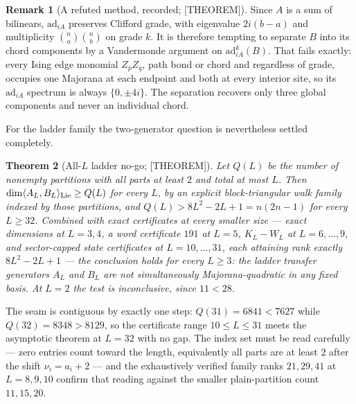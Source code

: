 \documentclass[11pt]{article}
\newtheorem{theorem}{Theorem}[section]
\theoremstyle{definition}
\newtheorem{remark}[theorem]{Remark}
\begin{document}
\begin{remark}[A refuted method, recorded; {[THEOREM]}]
Since $A$ is a sum of bilinears, $\mathrm{ad}_{iA}$ preserves Clifford grade, with eigenvalue
$2i(b-a)$ and multiplicity $\binom na\binom nb$ on grade $k$. It is therefore tempting to separate
$B$ into its chord components by a Vandermonde argument on $\mathrm{ad}_{iA}^k(B)$. That fails
exactly: every Ising edge monomial $Z_pZ_q$, path bond or chord and regardless of grade, occupies one
Majorana at each endpoint and both at every interior site, so its $\mathrm{ad}_{iA}$ spectrum is
always $\{0,\pm4i\}$. The separation recovers only three global components and never an individual
chord.
\end{remark}

For the ladder family the two-generator question is nevertheless settled completely.

\begin{theorem}[All-$L$ ladder no-go; {[THEOREM]}]\label{thm:ladderallL}
Let $Q(L)$ be the number of nonempty partitions with all parts at least $2$ and total at most $L$.
Then $\dim\langle A_L,B_L\rangle_{\rm Lie}\ge Q(L)$ for every $L$, by an explicit block-triangular
walk family indexed by those partitions, and $Q(L)>8L^2-2L+1=n(2n-1)$ for every $L\ge32$. Combined
with exact certificates at every smaller size --- exact dimensions at $L=3,4$, a word certificate
$191$ at $L=5$, $K_L-W_L$ at $L=6,\dots,9$, and sector-capped state certificates at
$L=10,\dots,31$, each attaining rank exactly $8L^2-2L+1$ --- the conclusion holds for every $L\ge3$:
the ladder transfer generators $A_L$ and $B_L$ are not simultaneously Majorana-quadratic in any fixed
basis. At $L=2$ the test is inconclusive, since $11<28$.
\end{theorem}

The seam is contiguous by exactly one step: $Q(31)=6841<7627$ while $Q(32)=8348>8129$, so the
certificate range $10\le L\le31$ meets the asymptotic theorem at $L=32$ with no gap. The index set
must be read carefully --- zero entries count toward the length, equivalently all parts are at least
$2$ after the shift $\nu_i=a_i+2$ --- and the exhaustively verified family ranks $21,29,41$ at
$L=8,9,10$ confirm that reading against the smaller plain-partition count $11,15,20$.
\end{document}
